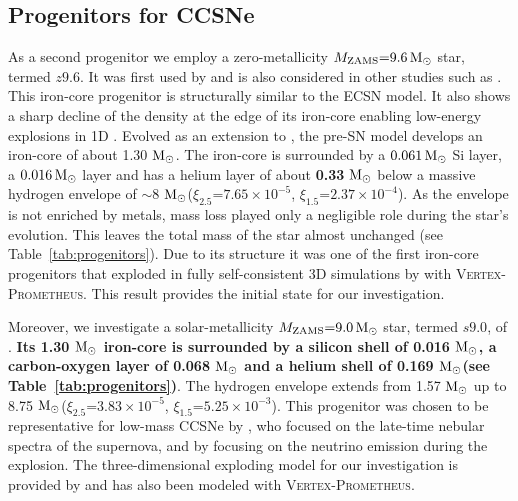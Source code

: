 \documentclass[fleqn,usenatbib]{mnras}
\newcommand{\solm}{\ensuremath{\rm{M_{\odot}}}\xspace}
\newcommand{\vertexprom}{\textsc{Vertex-Prometheus}\xspace}
\begin{document}
\subsection{Progenitors for CCSNe}
As a second progenitor we employ a zero-metallicity $M_{\text{ZAMS}}\mathord{=}9.6\,\solm$ star, termed $z9.6$. It was first used by \citet{Janka2012} and is also considered in other studies such as \citet{Mueller2013,Mueller2018}. This iron-core progenitor is structurally similar to the ECSN model. It also shows a sharp decline of the density at the edge of its iron-core enabling low-energy explosions in 1D \citep{Melson2015}. 
Evolved as an extension to \cite{Heger2010}, the pre-SN model develops an iron-core of about 1.30 \solm. The iron-core is surrounded by a $0.061\,\solm$ Si layer, a $0.016\,\solm$ layer and has a helium layer of about \textbf{0.33} \solm below a massive hydrogen envelope of $\mathord{\sim}8$ \solm ($\xi_{2.5}\mathord{=}7.65 \times 10^{-5}$, $\xi_{1.5}\mathord{=}2.37 \times 10^{-4}$). As the envelope is not enriched by metals, mass loss played only a negligible role during the star's evolution. This leaves the total mass of the star almost unchanged (see Table~\ref{tab:progenitors}). 
Due to its structure it was one of the first iron-core progenitors that exploded in fully self-consistent 3D simulations by \cite{Melson2015a} with \vertexprom. This result provides the initial state for our investigation. 

Moreover, we investigate a solar-metallicity $M_{\text{ZAMS}} \mathord{=} 9.0 \,\solm$ star, termed $s9.0$, of \citet{Sukhbold2016}. \textbf{Its 1.30 \solm iron-core is surrounded by a silicon shell of 0.016 \solm, a carbon-oxygen layer of 0.068 \solm and a helium shell of 0.169 \solm (see Table~\ref{tab:progenitors})}. The hydrogen envelope extends from 1.57 \solm up to 8.75 \solm ($\xi_{2.5}\mathord{=}3.83 \times 10^{-5}$, $\xi_{1.5}\mathord{=}5.25 \times 10^{-3}$).
This progenitor was chosen to be representative for low-mass CCSNe by \cite{Jerkstrand2018}, who focused on the late-time nebular spectra of the supernova, and by \cite{Glas2019} focusing on the neutrino emission during the explosion. The three-dimensional exploding model for our investigation is provided by \citet{Melson2019} and has also been modeled with \vertexprom. 
\end{document}
